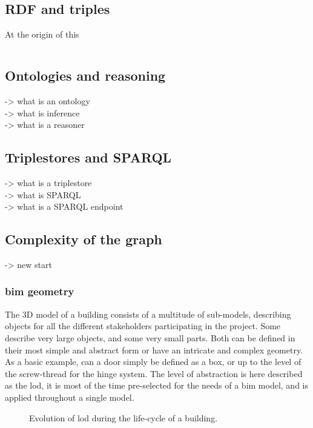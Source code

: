 \subsection{RDF and triples}
At the origin of this

\inputminted{turtle}{figures/snippets/rdfSample.ttl}

\subsection{Ontologies and reasoning}
-> what is an ontology\\
-> what is inference\\
-> what is a reasoner

\subsection{Triplestores and SPARQL}
-> what is a triplestore\\
-> what is SPARQL\\
-> what is a SPARQL endpoint

\subsection{Complexity of the graph}
-> new start
\subsubsection{\ac{bim} geometry} \label{subsec:bimGeometry}
The 3D model of a building consists of a multitude of sub-models, describing objects for all the different stakeholders participating in the project. Some describe very large objects, and some very small parts. Both can be defined in their most simple and abstract form or have an intricate and complex geometry. As a basic example, can a door simply be defined as a box, or up to the level of the screw-thread for the hinge system. The level of abstraction is here described as the \ac{lod}, it is most of the time pre-selected for the needs of a \ac{bim} model, and is applied throughout a single model.

\begin{figure}[h]
	\centering
	
	\caption{Evolution of \acs{lod} during the life-cycle of a building.}
	\label{fig:bimGraph}
\end{figure}

